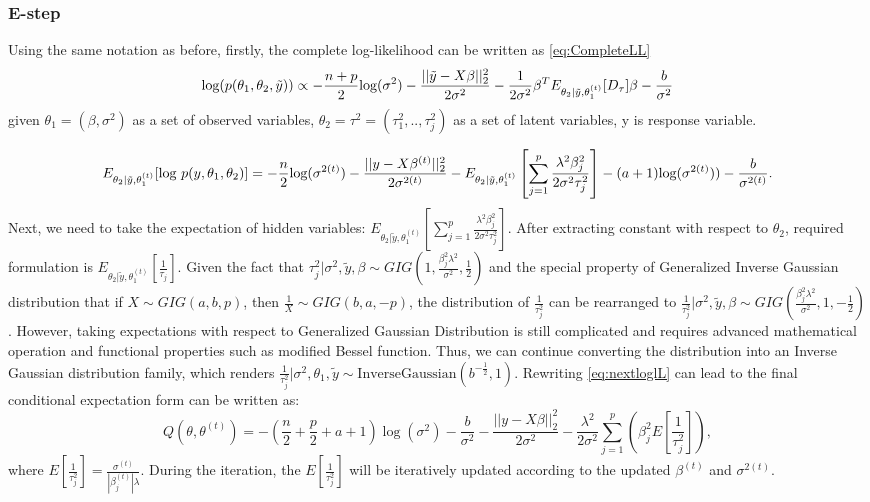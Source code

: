 \subsubsection{E-step}
Using the same notation as before, firstly, the complete log-likelihood can be written as \autoref{eq:CompleteLL}
\begin{equation}
	\label{eq:CompleteLL}
	\textnormal{log}(p(\theta_1,\theta_2,\tilde{y})) \propto -\frac{n+p}{2}\textnormal{log}(\sigma^2) - \frac{||\tilde{y}-X\beta||_2^2}{2\sigma^2} - \frac{1}{2\sigma^2}\beta^TE_{\theta_2|\tilde{y},\theta_1^{(t)}}[D_{\tau}]\beta - \frac{b}{\sigma^2}
\end{equation}
given $\theta_1 = (\beta,\sigma^2)$ as a set of observed variables, $\theta_2 = \tau^2 = (\tau_1^2,..,\tau_j^2)$ as a set of latent variables, y is response variable.


\begin{equation}
	\label{eq:nextloglL}
	E_{\theta_2|\tilde{y},\theta_1^{(t)}}[\textnormal{log } p(y,\theta_1,\theta_2)] = -\frac{n}{2} \textnormal{log}(\sigma^{2(t)}) - \frac{||y-X\beta^{(t)}||_2^2}{2\sigma^{2(t)}} - E_{\theta_2 |\tilde{y},\theta_1^{(t)}}\left[\sum_{j=1}^p \frac{\lambda^2\beta_j^2}{2\sigma^2\tau_j^2}\right] -(a+1)\textnormal{log}(\sigma^{2(t)})) - \frac{b}{\sigma^{2(t)}}.
\end{equation}
Next, we need to take the expectation of hidden variables: $E_{\theta_2 |\tilde{y},\theta_1^{(t)}}[\sum_{j=1}^p \frac{\lambda^2\beta_j^2}{2\sigma^2\tau_j^2}]$. After extracting constant with respect to $\theta_2$, required formulation is $E_{\theta_2 |\tilde{y},\theta_1^{(t)}}[\frac{1}{\tau_j}]$. Given the fact that $\tau_j^2|\sigma^2,\tilde{y},\beta \sim GIG(1,\frac{\beta_j^2\lambda^2}{\sigma^2},\frac{1}{2})$ and the special property of Generalized Inverse Gaussian distribution that if $X \sim GIG(a,b,p)$, then $\frac{1}{X} \sim GIG(b, a,-p)$, the distribution of $\frac{1}{\tau_j^2}$ can be rearranged to  $\frac{1}{\tau_j^2}|\sigma^2,\tilde{y},\beta \sim GIG(\frac{\beta_j^2\lambda^2}{\sigma^2},1,-\frac{1}{2})$.
However, taking expectations with respect to Generalized Gaussian Distribution is still complicated and requires advanced mathematical operation and functional properties such as modified Bessel function. Thus, we can continue converting the distribution into an Inverse Gaussian distribution family, which renders $\frac{1}{\tau_j^2}|\sigma^2,\theta_1,\tilde{y} \sim \text{InverseGaussian}(b^{-\frac{1}{2}},1)$. Rewriting \autoref{eq:nextloglL} can lead to the final conditional expectation form can be written as:
\begin{equation}
	Q(\theta,\theta^{(t)}) = -\left(\frac{n}{2}+\frac{p}{2}+a+1\right)\log(\sigma^2)-\frac{b}{\sigma^2}-\frac{||y-X\beta||_2^2}{2\sigma^2}-\frac{\lambda^2}{2\sigma^2}\sum_{j=1}^{p}\left(\beta_j^2 E\left[\frac{1}{\tau_j^2}\right]\right),
\end{equation}
where $	E\left[\frac{1}{\tau_j^2}\right] = \frac{\sigma^{(t)}}{|\beta_j^{(t)}|\lambda}$. During the iteration, the $E\left[\frac{1}{\tau_j^2}\right]$ will be iteratively updated according to the updated $\beta^{(t)}$ and $\sigma^{2(t)}$.
